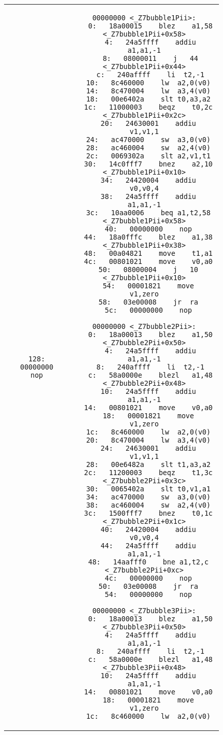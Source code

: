 \begin{figure}
\begin{center}
\begin{tabular}{c c}
\begin{minipage}[t]{.4\textwidth}
\begin{lstlisting}[language={[mips]Assembler},caption=bubble0,basicstyle=\ttfamily\tiny, tabsize=2]
 128:	00000000 	nop
		\end{lstlisting}
	\end{minipage} 
	&
	\begin{minipage}[t]{.4\textwidth}
		\begin{lstlisting}[language={[mips]Assembler},caption=bubble1, basicstyle=\ttfamily\tiny, tabsize=2]
00000000 <_Z7bubble1Pii>:
   0:	18a00015 	blez	a1,58 <_Z7bubble1Pii+0x58>
   4:	24a5ffff 	addiu	a1,a1,-1
   8:	08000011 	j	44 <_Z7bubble1Pii+0x44>
   c:	240affff 	li	t2,-1
  10:	8c460000 	lw	a2,0(v0)
  14:	8c470004 	lw	a3,4(v0)
  18:	00e6402a 	slt	t0,a3,a2
  1c:	11000003 	beqz	t0,2c <_Z7bubble1Pii+0x2c>
  20:	24630001 	addiu	v1,v1,1
  24:	ac470000 	sw	a3,0(v0)
  28:	ac460004 	sw	a2,4(v0)
  2c:	0069302a 	slt	a2,v1,t1
  30:	14c0fff7 	bnez	a2,10 <_Z7bubble1Pii+0x10>
  34:	24420004 	addiu	v0,v0,4
  38:	24a5ffff 	addiu	a1,a1,-1
  3c:	10aa0006 	beq	a1,t2,58 <_Z7bubble1Pii+0x58>
  40:	00000000 	nop
  44:	18a0fffc 	blez	a1,38 <_Z7bubble1Pii+0x38>
  48:	00a04821 	move	t1,a1
  4c:	00801021 	move	v0,a0
  50:	08000004 	j	10 <_Z7bubble1Pii+0x10>
  54:	00001821 	move	v1,zero
  58:	03e00008 	jr	ra
  5c:	00000000 	nop
		\end{lstlisting}
		\begin{lstlisting}[language={[mips]Assembler},caption=bubble2, basicstyle=\ttfamily\tiny, tabsize=2]
00000000 <_Z7bubble2Pii>:
   0:	18a00013 	blez	a1,50 <_Z7bubble2Pii+0x50>
   4:	24a5ffff 	addiu	a1,a1,-1
   8:	240affff 	li	t2,-1
   c:	58a0000e 	blezl	a1,48 <_Z7bubble2Pii+0x48>
  10:	24a5ffff 	addiu	a1,a1,-1
  14:	00801021 	move	v0,a0
  18:	00001821 	move	v1,zero
  1c:	8c460000 	lw	a2,0(v0)
  20:	8c470004 	lw	a3,4(v0)
  24:	24630001 	addiu	v1,v1,1
  28:	00e6482a 	slt	t1,a3,a2
  2c:	11200003 	beqz	t1,3c <_Z7bubble2Pii+0x3c>
  30:	0065402a 	slt	t0,v1,a1
  34:	ac470000 	sw	a3,0(v0)
  38:	ac460004 	sw	a2,4(v0)
  3c:	1500fff7 	bnez	t0,1c <_Z7bubble2Pii+0x1c>
  40:	24420004 	addiu	v0,v0,4
  44:	24a5ffff 	addiu	a1,a1,-1
  48:	14aafff0 	bne	a1,t2,c <_Z7bubble2Pii+0xc>
  4c:	00000000 	nop
  50:	03e00008 	jr	ra
  54:	00000000 	nop
		\end{lstlisting}
		\begin{lstlisting}[language={[mips]Assembler},caption=bubble3, basicstyle=\ttfamily\tiny, tabsize=2]
00000000 <_Z7bubble3Pii>:
   0:	18a00013 	blez	a1,50 <_Z7bubble3Pii+0x50>
   4:	24a5ffff 	addiu	a1,a1,-1
   8:	240affff 	li	t2,-1
   c:	58a0000e 	blezl	a1,48 <_Z7bubble3Pii+0x48>
  10:	24a5ffff 	addiu	a1,a1,-1
  14:	00801021 	move	v0,a0
  18:	00001821 	move	v1,zero
  1c:	8c460000 	lw	a2,0(v0)

\end{lstlisting}
\end{minipage}
\end{tabular}
\end{center}
\end{figure}
